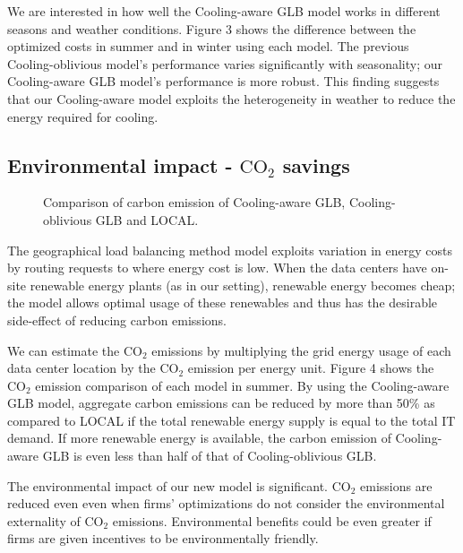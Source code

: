 \documentclass{acm_proc_article-sp}
\newcommand{\carbondioxide}{\ensuremath{\mathrm{CO}_2}}
\begin{document}
We are interested in how well the Cooling-aware GLB model works in different seasons and weather conditions. Figure 3 shows the difference between the optimized costs in summer and in winter using each model. The previous Cooling-oblivious model's performance varies significantly with seasonality; our Cooling-aware GLB model's performance is more robust. This finding suggests that our Cooling-aware model exploits the heterogeneity in weather to reduce the energy required for cooling.



\subsection{Environmental impact - \carbondioxide{} savings}


\begin{figure}
\centering
{}
\caption{Comparison of carbon emission of Cooling-aware GLB, Cooling-oblivious GLB and LOCAL.}
\end{figure}


The geographical load balancing method model exploits variation in energy costs by routing requests to where energy cost is low. When the data centers have on-site renewable energy plants (as in our setting), renewable energy becomes cheap; the model allows optimal usage of these renewables and thus has the desirable side-effect of reducing carbon emissions.

We can estimate the \carbondioxide{} emissions by multiplying the grid energy usage of each data center location by the \carbondioxide{} emission per energy unit. Figure 4 shows the \carbondioxide{} emission comparison of each model in summer. By using the Cooling-aware GLB model, aggregate carbon emissions can be reduced by more than 50\% as compared to LOCAL if the total renewable energy supply is equal to the total IT demand. If more renewable energy is available, the carbon emission of Cooling-aware GLB is even less than half of that of Cooling-oblivious GLB.

The environmental impact of our new model is significant. \carbondioxide{} emissions are reduced even even when firms' optimizations do not consider the environmental externality of \carbondioxide{} emissions. Environmental benefits could be even greater if firms are given incentives to be environmentally friendly.
\end{document}
